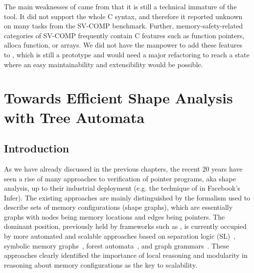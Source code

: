 {The main weaknesses of \forester came from that it is still a technical immature of the tool.
It did not support the whole C syntax, and therefore it reported
unknown on many tasks from the SV-COMP benchmark.
Further, memory-safety-related categories of SV-COMP frequently contain C features such as function  
pointers, alloca function, or arrays.
We did not have the manpower to add these features to \forester, which is still a prototype and
would need a major refactoring to reach a state where an easy maintainability and extensibility would be possible.

\chapter{Towards Efficient Shape Analysis with Tree Automata}
\label{ch:netys}
\section{Introduction}

%
%
As we have already discussed in the previous chapters, the recent 20 years have seen a rise of many approaches to verification of pointer programs, aka shape analysis, up to their industrial deployment (e.g. the technique of \cite{abduction11} in Facebook's Infer).
%
The existing approaches are mainly distinguished by the formalism used to describe sets of memory configurations (shape graphs), which are essentially graphs with nodes being memory locations and edges being pointers.
%
The dominant position, previously held by frameworks such as \cite{pale,pale01},
is currently occupied by more automated and scalable approaches based on separation
logic (SL)~\cite{Reynolds:SepLogic:02,InvaderCAV07,sas07:chang_rival_necula}, symbolic memory
graphs~\cite{dudka13sas}, forest automata~\cite{forester12}, and graph grammars~\cite{Juggrnaut2015}.
These approaches clearly identified the importance of local reasoning and modularity in reasoning about memory configurations as the key to scalability.

}
